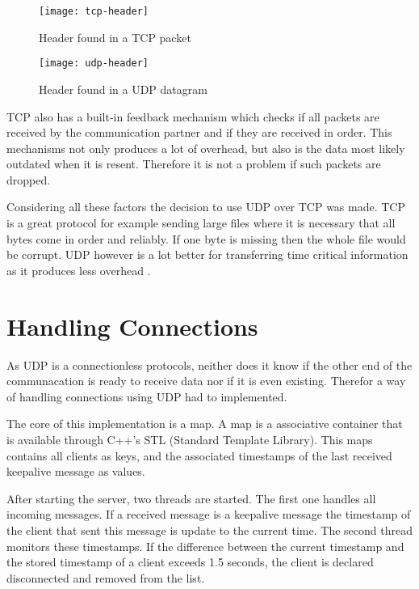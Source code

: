 \begin{figure}[H]
    \centering
    \texttt{[image: tcp-header]}
    \caption{Header found in a TCP packet}
    \label{fig:tcp-header}
\end{figure}

\begin{figure}[H]
    \centering
    \texttt{[image: udp-header]}
    \caption{Header found in a UDP datagram}
    \label{fig:udp-header}
\end{figure}

TCP also has a built-in feedback mechanism which checks if all packets are received by the communication partner and if they are received in order. This mechanisms not only produces a lot of overhead, but also is the data
most likely outdated when it is resent. Therefore it is not a problem if such packets are dropped.

Considering all these factors the decision to use UDP over TCP was made. TCP is a great protocol for example sending large files where it is necessary that all bytes come in order and reliably. If one byte is missing
then the whole file would be corrupt. UDP however is a lot better for transferring time critical information as it produces less overhead \autocite{TCPUDPRTlifesize}.

\section {Handling Connections}

As UDP is a connectionless protocols, neither does it know if the other end of the communacation is ready to receive data nor if it is even existing. Therefor a way of handling connections using UDP had to implemented.

The core of this implementation is a map. A map is a associative container that is available through C++'s STL (Standard Template Library). This maps contains all clients as keys, and the associated timestamps of the last
received keepalive message as values.

After starting the server, two threads are started. The first one handles all incoming messages. If a received message is a keepalive message the timestamp of the client that sent this message is update
to the current time. The second thread monitors these timestamps. If the difference between the current timestamp and the stored timestamp of a client exceeds 1.5 seconds, the client is declared disconnected and removed
from the list.

